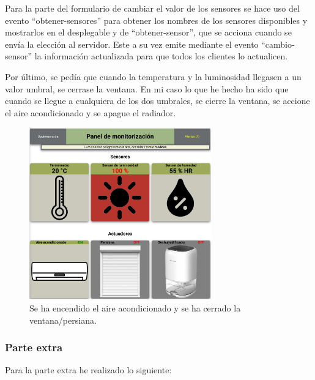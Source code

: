 \documentclass{article}
\begin{document}
Para la parte del formulario de cambiar el valor de los sensores se hace uso del evento ``obtener-sensores'' para obtener los nombres de los sensores disponibles y mostrarlos en el desplegable y de ``obtener-sensor'', que se acciona cuando se envía la elección al servidor. Este a su vez emite mediante el evento ``cambio-sensor'' la información actualizada para que todos los clientes lo actualicen.

\bigskip

Por último, se pedía que cuando la temperatura y la luminosidad llegasen a un valor umbral, se cerrase la ventana. En mi caso lo que he hecho ha sido que cuando se llegue a cualquiera de los dos umbrales, se cierre la ventana, se accione el aire acondicionado y se apague el radiador.

\begin{figure}[H]
    \centering
    \includegraphics[width=0.7\textwidth]{images/muchaluz.png}
    \caption{Se ha encendido el aire acondicionado y se ha cerrado la ventana/persiana.}
\end{figure}

\newpage

\subsubsection{Parte extra}
Para la parte extra he realizado lo siguiente:
\end{document}

